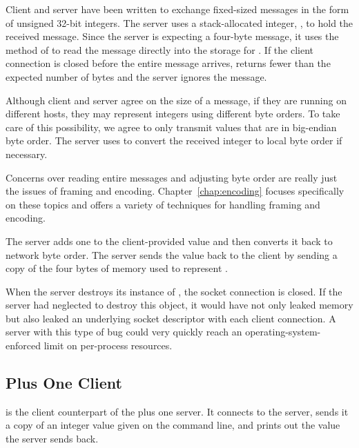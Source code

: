 \begin{topcode}
Client and server have been written to exchange fixed-sized messages
in the form of unsigned 32-bit integers.  The server uses a
stack-allocated integer, , to hold the received message.
Since the server is expecting a four-byte message, it uses the
 method of  to read the message
directly into the storage for .  If the client connection is
closed before the entire message arrives,  returns
fewer than the expected number of bytes and the server ignores the
message.

Although client and server agree on the size of a message, if they are
running on different hosts, they may represent integers using
different byte orders.  To take care of this possibility, we agree to
only transmit values that are in big-endian byte order.  The server
uses  to convert the received integer to local byte
order if necessary.  

Concerns over reading entire messages and adjusting byte order are
really just the issues of framing and encoding.
Chapter~\ref{chap:encoding} focuses specifically on these topics and
offers a variety of techniques for handling framing and encoding.


The server adds one to the client-provided value and then converts it
back to network byte order.  The server sends the value back to
the client by sending a copy of the four bytes of memory used to
represent .


When the server destroys its instance of , the
socket connection is closed.  If the server had neglected
to destroy this object, it would have not only leaked memory but also
leaked an underlying socket descriptor with each client connection.  A
server with this type of bug could very quickly reach an
operating-system-enforced limit on per-process resources.

\end{topcode}

\subsection{Plus One Client}

 is the client counterpart of the plus one
server.  It connects to the server, sends it a copy of an integer
value given on the command line, and prints out the value the server
sends back.

